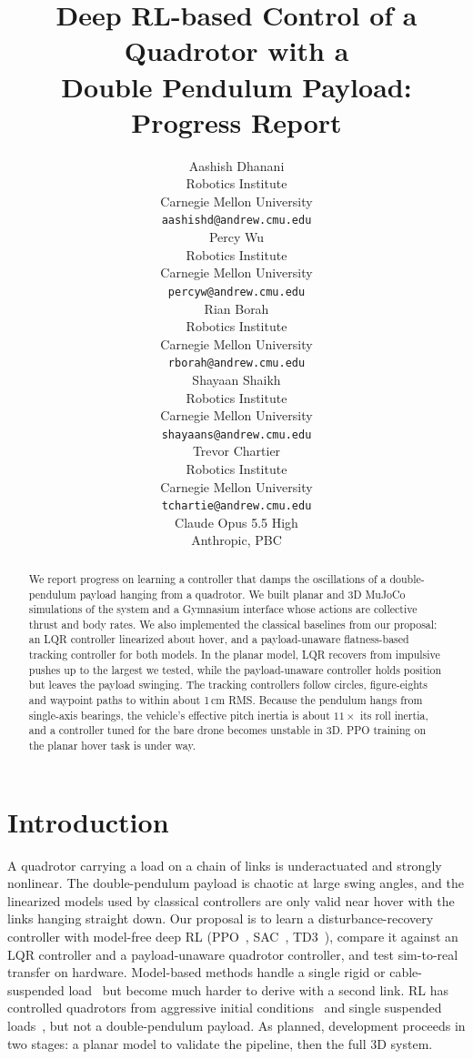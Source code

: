 \documentclass{article}
\title{Deep RL-based Control of a Quadrotor with a\\Double Pendulum Payload: Progress Report}
\author{
  Aashish Dhanani\\
  Robotics Institute\\
  Carnegie Mellon University\\
  \texttt{aashishd@andrew.cmu.edu} \\
  \And
  Percy Wu\\
  Robotics Institute\\
  Carnegie Mellon University\\
  \texttt{percyw@andrew.cmu.edu} \\
  \And
  Rian Borah\\
  Robotics Institute\\
  Carnegie Mellon University\\
  \texttt{rborah@andrew.cmu.edu} \\
  \AND
  Shayaan Shaikh\\
  Robotics Institute\\
  Carnegie Mellon University\\
  \texttt{shayaans@andrew.cmu.edu} \\
  \And
  Trevor Chartier\\
  Robotics Institute\\
  Carnegie Mellon University\\
  \texttt{tchartie@andrew.cmu.edu} \\
  \And
  Claude Opus 5.5 High\\
  Anthropic, PBC\\
}
\begin{document}
\maketitle

\begin{abstract}
We report progress on learning a controller that damps the oscillations of a
double-pendulum payload hanging from a quadrotor. We built planar and 3D MuJoCo
simulations of the system and a Gymnasium interface whose actions are collective
thrust and body rates. We also implemented the classical baselines from our
proposal: an LQR controller linearized about hover, and a payload-unaware
flatness-based tracking controller for both models. In the planar model, LQR
recovers from impulsive pushes up to the largest we tested, while the payload-unaware
controller holds position but leaves the payload swinging. The tracking controllers
follow circles, figure-eights and waypoint paths to within about 1\,cm RMS. Because
the pendulum hangs from single-axis bearings, the vehicle's effective pitch inertia
is about $11\times$ its roll inertia, and a controller tuned for the bare drone
becomes unstable in 3D. PPO training on the planar hover task is under way.
\end{abstract}


\section{Introduction}
\label{sec:intro}

A quadrotor carrying a load on a chain of links is underactuated and strongly
nonlinear. The double-pendulum payload is chaotic at large swing angles, and the
linearized models used by classical controllers are only valid near hover with the
links hanging straight down. Our proposal is to learn a disturbance-recovery
controller with model-free deep RL (PPO~\citep{schulman2017ppo},
SAC~\citep{haarnoja2018sac}, TD3~\citep{fujimoto2018td3}), compare it against an LQR
controller and a payload-unaware quadrotor controller, and test sim-to-real transfer on
hardware. Model-based methods handle a single rigid or cable-suspended
load~\citep{sreenath2013geometric,palunko2012trajectory} but become much harder to
derive with a second link. RL has controlled quadrotors from aggressive initial
conditions~\citep{hwangbo2017control,kaufmann2023champion} and single suspended
loads~\citep{faust2017automated,kim2025roverfly}, but not a double-pendulum payload. As
planned, development proceeds in two stages: a planar model to validate the pipeline,
then the full 3D system.
\end{document}

